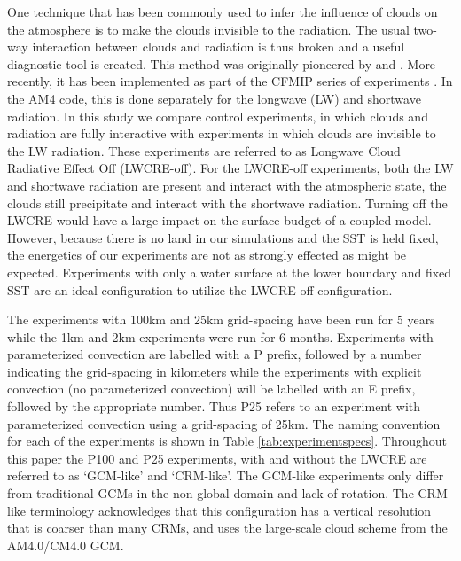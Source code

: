 \documentclass[draft]{agujournal2019}
\begin{document}
One technique that has been commonly used to infer the influence of clouds on the atmosphere is to make the clouds invisible to the radiation.  
The usual two-way interaction between clouds and radiation is thus broken and a useful diagnostic tool is created.  
This method was originally pioneered by  and .  
More recently, it has been implemented as part of the CFMIP series of experiments \cite{Stevens_etal_2012, Webb_etal_2017}.
In the AM4 code, this is done separately for the longwave (LW) and shortwave radiation.  
In this study we compare control experiments, in which clouds and radiation are fully interactive with experiments in which clouds are invisible to the LW radiation.  
These experiments are referred to as Longwave Cloud Radiative Effect Off (LWCRE-off).  
For the LWCRE-off experiments, both the LW and shortwave radiation are present and interact with 
the atmospheric state, the clouds still precipitate and interact with the shortwave radiation.   
Turning off the LWCRE would have a large impact on the surface budget of a coupled model.  
However, because there is no land in our simulations and the SST is held fixed, the energetics of our experiments are not as
strongly effected as might be expected.  Experiments with only a water surface at the lower boundary and 
fixed SST are an ideal configuration to utilize the LWCRE-off configuration. 

The experiments with 100km and 25km grid-spacing have been run for 5 years while the 
1km and 2km experiments were run for 6 months.  Experiments with parameterized convection are labelled with a P prefix, followed
by a number indicating the grid-spacing in kilometers while the experiments with explicit convection (no parameterized convection) will be 
labelled with an E prefix, followed by the appropriate number.  Thus P25 refers to an experiment with parameterized convection using a 
grid-spacing of 25km. %
The naming convention for each of the experiments is shown in Table \ref{tab:experimentspecs}.   
Throughout this paper the P100 and P25 experiments, with and without the LWCRE are referred to as `GCM-like' and
`CRM-like'.  The GCM-like experiments only differ from traditional GCMs in the non-global domain and lack of rotation.  
The CRM-like terminology acknowledges that this configuration %
has a vertical resolution that is coarser than many CRMs, and uses the large-scale cloud scheme from the AM4.0/CM4.0 GCM.  
  
\end{document}
